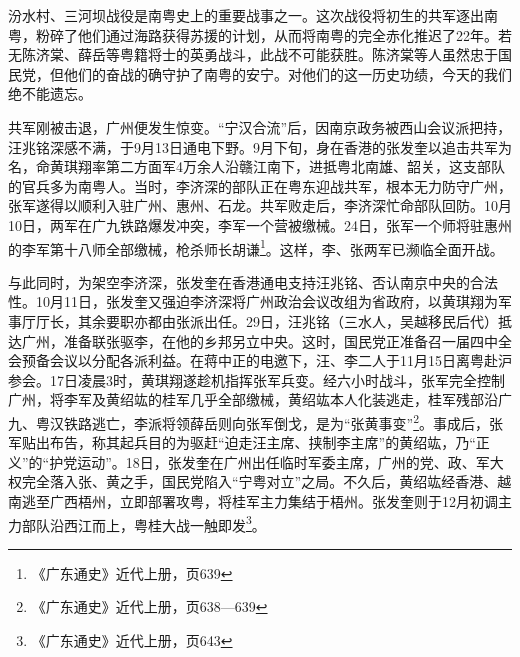 汾水村、三河坝战役是南粤史上的重要战事之一。这次战役将初生的共军逐出南粤，粉碎了他们通过海路获得苏援的计划，从而将南粤的完全赤化推迟了22年。若无陈济棠、薛岳等粤籍将士的英勇战斗，此战不可能获胜。陈济棠等人虽然忠于国民党，但他们的奋战的确守护了南粤的安宁。对他们的这一历史功绩，今天的我们绝不能遗忘。

共军刚被击退，广州便发生惊变。“宁汉合流”后，因南京政务被西山会议派把持，汪兆铭深感不满，于9月13日通电下野。9月下旬，身在香港的张发奎以追击共军为名，命黄琪翔率第二方面军4万余人沿赣江南下，进抵粤北南雄、韶关，这支部队的官兵多为南粤人。当时，李济深的部队正在粤东迎战共军，根本无力防守广州，张军遂得以顺利入驻广州、惠州、石龙。共军败走后，李济深忙命部队回防。10月10日，两军在广九铁路爆发冲突，李军一个营被缴械。24日，张军一个师将驻惠州的李军第十八师全部缴械，枪杀师长胡谦\footnote{《广东通史》近代上册，页639}。这样，李、张两军已濒临全面开战。

与此同时，为架空李济深，张发奎在香港通电支持汪兆铭、否认南京中央的合法性。10月11日，张发奎又强迫李济深将广州政治会议改组为省政府，以黄琪翔为军事厅厅长，其余要职亦都由张派出任。29日，汪兆铭（三水人，吴越移民后代）抵达广州，准备联张驱李，在他的乡邦另立中央。这时，国民党正准备召一届四中全会预备会议以分配各派利益。在蒋中正的电邀下，汪、李二人于11月15日离粤赴沪参会。17日凌晨3时，黄琪翔遂趁机指挥张军兵变。经六小时战斗，张军完全控制广州，将李军及黄绍竑的桂军几乎全部缴械，黄绍竑本人化装逃走，桂军残部沿广九、粤汉铁路逃亡，李派将领薛岳则向张军倒戈，是为“张黄事变”\footnote{《广东通史》近代上册，页638—639}。事成后，张军贴出布告，称其起兵目的为驱赶“迫走汪主席、挟制李主席”的黄绍竑，乃“正义”的“护党运动”。18日，张发奎在广州出任临时军委主席，广州的党、政、军大权完全落入张、黄之手，国民党陷入“宁粤对立”之局。不久后，黄绍竑经香港、越南逃至广西梧州，立即部署攻粤，将桂军主力集结于梧州。张发奎则于12月初调主力部队沿西江而上，粤桂大战一触即发\footnote{《广东通史》近代上册，页643}。

